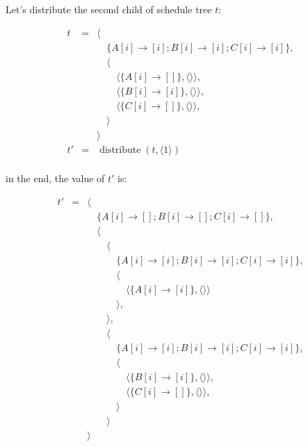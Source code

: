 \documentclass{article}
\DeclareMathOperator\distribute{distribute}
\begin{document}
Let's distribute the second child of schedule tree $t$:

\[
    \begin{array}{lcl}
        t &=& \langle \\
          & & \quad\{A[i] \rightarrow [i] ; B[i] \rightarrow [i] ; C[i] \rightarrow [i]\},\\
          & & \quad\langle \\
          & & \quad\quad \langle\{ A[i] \rightarrow [] \}, \langle\rangle\rangle,\\
          & & \quad\quad \langle\{ B[i] \rightarrow [i] \}, \langle\rangle\rangle,\\
          & & \quad\quad \langle\{ C[i] \rightarrow [] \}, \langle\rangle\rangle,\\
          & & \quad\rangle \\
          & & \rangle \\
        t'&=& \distribute(t, \langle 1 \rangle) \\
    \end{array}
\]

\noindent in the end, the value of $t'$ is:

\[
    \begin{array}{lcl}
        t'&=& \langle \\
          & & \quad\{A[i] \rightarrow [] ; B[i] \rightarrow [] ; C[i] \rightarrow [] \}, \\
          & & \quad\langle\\
          & & \quad\quad\langle \\
          & & \quad\quad\quad\{A[i] \rightarrow [i] ; B[i] \rightarrow [i] ; C[i] \rightarrow [i] \},\\
          & & \quad\quad\quad\langle \\
          & & \quad\quad\quad\quad \langle\{ A[i] \rightarrow [i] \}, \langle\rangle\rangle\\
          & & \quad\quad\quad\rangle, \\
          & & \quad\quad\rangle, \\
          & & \quad\quad\langle \\
          & & \quad\quad\quad\{A[i] \rightarrow [i] ; B[i] \rightarrow [i] ; C[i] \rightarrow [i]\},\\
          & & \quad\quad\quad\langle \\
          & & \quad\quad\quad\quad \langle\{ B[i] \rightarrow [i] \}, \langle\rangle\rangle,\\
          & & \quad\quad\quad\quad \langle\{ C[i] \rightarrow [] \}, \langle\rangle\rangle,\\
          & & \quad\quad\quad\rangle \\
          & & \quad\quad\rangle\\
          & & \rangle \\
    \end{array}
\]
\end{document}
